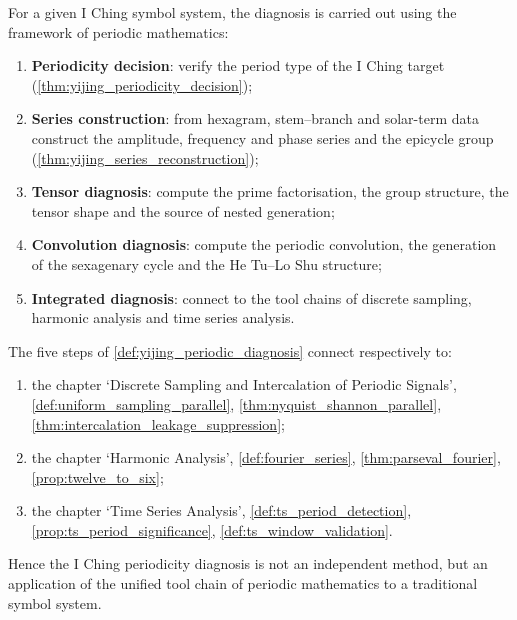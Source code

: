 \begin{definition}\label{def:yijing_periodic_diagnosis}
For a given I Ching symbol system, the diagnosis is carried out using the framework of periodic mathematics:
\begin{enumerate}[label=(\roman*)]
    \item \textbf{Periodicity decision}: verify the period type of the I Ching target (\cref{thm:yijing_periodicity_decision});
    \item \textbf{Series construction}: from hexagram, stem--branch and solar-term data construct the amplitude, frequency and phase series and the epicycle group (\cref{thm:yijing_series_reconstruction});
    \item \textbf{Tensor diagnosis}: compute the prime factorisation, the group structure, the tensor shape and the source of nested generation;
    \item \textbf{Convolution diagnosis}: compute the periodic convolution, the generation of the sexagenary cycle and the He Tu--Lo Shu structure;
    \item \textbf{Integrated diagnosis}: connect to the tool chains of discrete sampling, harmonic analysis and time series analysis.
\end{enumerate}
\end{definition}

\begin{theorem}\label{thm:yijing_diagnosis_integration}
The five steps of \cref{def:yijing_periodic_diagnosis} connect respectively to:
\begin{enumerate}[label=(\roman*)]
    \item the chapter `Discrete Sampling and Intercalation of Periodic Signals', \cref{def:uniform_sampling_parallel}, \cref{thm:nyquist_shannon_parallel}, \cref{thm:intercalation_leakage_suppression};
    \item the chapter `Harmonic Analysis', \cref{def:fourier_series}, \cref{thm:parseval_fourier}, \cref{prop:twelve_to_six};
    \item the chapter `Time Series Analysis', \cref{def:ts_period_detection}, \cref{prop:ts_period_significance}, \cref{def:ts_window_validation}.
\end{enumerate}
Hence the I Ching periodicity diagnosis is not an independent method, but an application of the unified tool chain of periodic mathematics to a traditional symbol system.
\end{theorem}

